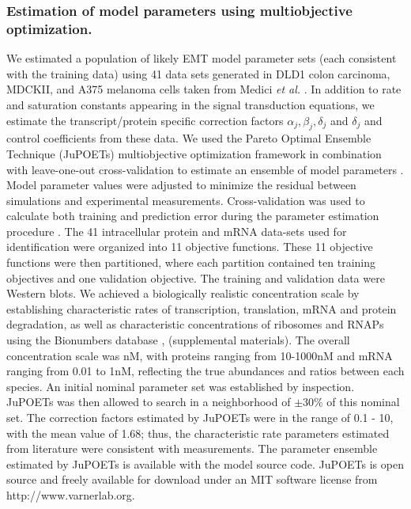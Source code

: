 \documentclass[11pt,letterpaper]{article}
\begin{document}
\subsubsection*{Estimation of model parameters using multiobjective optimization.}
We estimated a population of likely EMT model parameter sets (each consistent with the training data)
using 41 data sets generated in DLD1 colon carcinoma, MDCKII, and A375 melanoma cells taken from Medici \emph{et al.} \cite{Medici:2008fk}.
In addition to rate and saturation constants appearing in the signal transduction equations, we estimate the transcript/protein specific
correction factors $\alpha_{j},\beta_{j},\delta_{j}$ and $\delta_{j}$ and control coefficients from these data.
We used the Pareto Optimal Ensemble Technique (JuPOETs) multiobjective optimization framework in combination
with leave-one-out cross-validation to estimate an ensemble of model parameters \cite{Song:2010fk,JuPOETs-BioArXiv}.
Model parameter values were adjusted to minimize the residual between simulations and experimental measurements.
Cross-validation was used to calculate both training and prediction error during the parameter estimation procedure \cite{kohavi1995study}.
The 41 intracellular protein and mRNA data-sets used for identification were organized into 11 objective functions.
These 11 objective functions were then partitioned, where each partition contained ten training objectives and one validation objective.
The training and validation data were Western blots. We achieved a biologically realistic concentration scale by establishing characteristic rates of transcription, translation, mRNA and protein degradation, as well as characteristic concentrations of ribosomes and RNAPs using the Bionumbers database \cite{Milo:2010aa}, (supplemental materials).
The overall concentration scale was nM, with proteins ranging from 10-1000nM and mRNA ranging from 0.01 to 1nM, reflecting the true abundances and ratios between each species.
An initial nominal parameter set was established by inspection. JuPOETs was then allowed to search in a neighborhood of $\pm$30\% of this nominal set.
The correction factors estimated by JuPOETs were in the range of 0.1 - 10, with the mean value of 1.68; thus, the characteristic rate parameters estimated from literature were consistent with measurements.
The parameter ensemble estimated by JuPOETs is available with the model source code.
JuPOETs is open source and freely available for download under an MIT software license from http://www.varnerlab.org.
\end{document}

